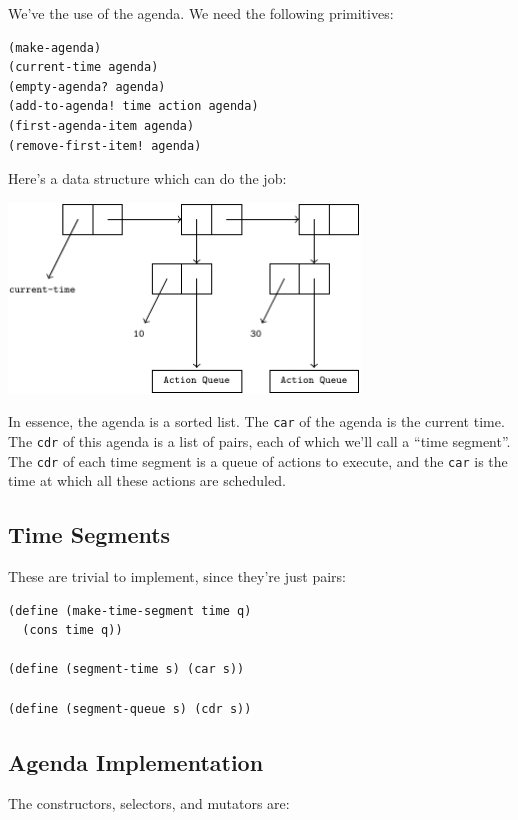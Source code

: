 \documentclass[9pt]{report}
\begin{document}
We've the use of the agenda. We need the following primitives:

\begin{verbatim}
(make-agenda)
(current-time agenda)
(empty-agenda? agenda)
(add-to-agenda! time action agenda)
(first-agenda-item agenda)
(remove-first-item! agenda)
\end{verbatim}

Here's a data structure which can do the job:

\begin{center}
\includegraphics[width=0.7\textwidth]{./images/the_agenda.pdf}
\end{center}

In essence, the agenda is a sorted list. The \texttt{car} of the agenda is the
current time. The \texttt{cdr} of this agenda is a list of pairs, each of
which we'll call a ``time segment''. The \texttt{cdr} of each time segment
is a queue of actions to execute, and the \texttt{car} is the time at
which all these actions are scheduled.

\subsection{Time Segments}
\label{sec:orgef8b57b}

These are trivial to implement, since they're just pairs:

\begin{verbatim}
(define (make-time-segment time q)
  (cons time q))

(define (segment-time s) (car s))

(define (segment-queue s) (cdr s))
\end{verbatim}

\subsection{Agenda Implementation}
\label{sec:org25b5e59}

The constructors, selectors, and mutators are:
\end{document}
